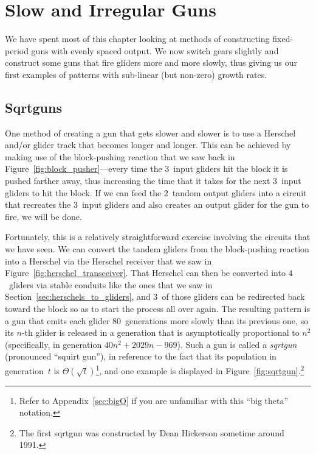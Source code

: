\section{Slow and Irregular Guns}\label{sec:irreg_guns}

We have spent most of this chapter looking at methods of constructing fixed-period guns with evenly spaced output. We now switch gears slightly and construct some guns that fire gliders more and more slowly, thus giving us our first examples of patterns with sub-linear (but non-zero) growth rates.


\subsection{Sqrtguns}\label{sec:sqrt_gun}

One method of creating a gun that gets slower and slower is to use a Herschel and/or glider track that becomes longer and longer. This can be achieved by making use of the block-pushing reaction that we saw back in Figure~\ref{fig:block_pusher}---every time the $3$~input gliders hit the block it is pushed farther away, thus increasing the time that it takes for the next $3$~input gliders to hit the block. If we can feed the $2$~tandom output gliders into a circuit that recreates the $3$~input gliders and also creates an output glider for the gun to fire, we will be done.

Fortunately, this is a relatively straightforward exercise involving the circuits that we have seen. We can convert the tandem gliders from the block-pushing reaction into a Herschel via the Herschel receiver that we saw in Figure~\ref{fig:herschel_transceiver}. That Herschel can then be converted into $4$~gliders via stable conduits like the ones that we saw in Section~\ref{sec:herschels_to_gliders}, and $3$~of those gliders can be redirected back toward the block so as to start the process all over again. The resulting pattern is a gun that emits each glider $80$~generations more slowly than its previous one, so its $n$-th glider is released in a generation that is asymptotically proportional to $n^2$ (specifically, in generation $40n^2 + 2029n - 969$). Such a gun is called a \emph{sqrtgun} (pronounced ``squirt gun''), in reference to the fact that its population in generation~$t$ is $\Theta(\sqrt{t})$\footnote{Refer to Appendix~\ref{sec:bigO} if you are unfamiliar with this ``big theta'' notation.}, and one example is displayed in Figure~\ref{fig:sqrtgun}.\footnote{The first sqrtgun was constructed by Dean Hickerson sometime around 1991.}

